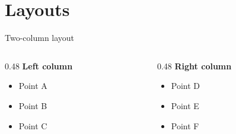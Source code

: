 \section{Layouts}

\begin{frame}{Two-column layout}
\begin{columns}[T]
  \begin{column}{0.48\textwidth}
    \textbf{Left column}
    \begin{itemize}[<+->]
      \item Point A
      \item Point B
      \item Point C
    \end{itemize}
  \end{column}
  \begin{column}{0.48\textwidth}
    \textbf{Right column}
    \begin{itemize}[<+->]
      \item Point D
      \item Point E
      \item Point F
    \end{itemize}
  \end{column}
\end{columns}
\end{frame}
